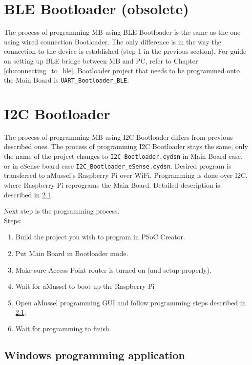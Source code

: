 \section{BLE Bootloader (obsolete)}

The process of programming MB using BLE Bootloader is the same as the one using wired connection Bootloader.
The only difference is in the way the connection to the device is established (step 1 in the previous section).
For guide on setting up BLE bridge between MB and PC, refer to Chapter \ref{ch:connecting_to_ble}.
Bootloader project that needs to be programmed onto the Main Board is \texttt{UART\_Bootloader\_BLE}.

\section{I2C Bootloader}

The process of programming MB using I2C Bootloader differs from previous described ones.
The process of programming I2C Bootloader stays the same, only the name of the project changes to \texttt{I2C\_Bootloader.cydsn} in Main Board case, or in eSense board case \texttt{I2C\_Bootloader\_eSense.cydsn}.
Desired program is transferred to aMussel's Raspberry Pi over WiFi.
Programming is done over I2C, where Raspberry Pi reprograms the Main Board.
Detailed description is described in \ref{subsec:win_prog_app}.


Next step is the programming process.\\
Steps:
\begin{enumerate}
	\item Build the project you wish to program in PSoC Creator.
	\item Put Main Board in Bootloader mode.
	\item Make sure Access Point router is turned on (and setup properly).
	\item Wait for aMussel to boot up the Raspberry Pi 
	\item Open aMussel programming GUI and follow programming steps described in \ref{subsec:win_prog_app}.
	\item Wait for programming to finish.
\end{enumerate}

\subsection{Windows programming application}
\label{subsec:win_prog_app}

